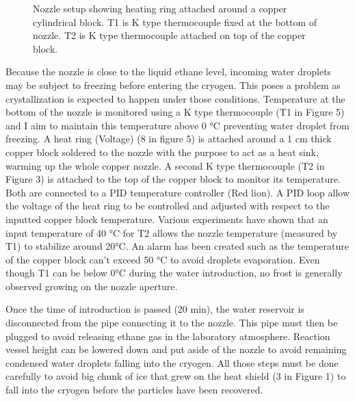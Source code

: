 \documentclass[letterpaper,10pt,english]{jupyterBook}
\begin{document}
\begin{figure}[htbp]
\centering
\capstart

\noindent{}
\caption{Nozzle setup showing heating ring attached around a copper cylindrical block. T1 is K type thermocouple fixed at the bottom of nozzle. T2 is K type thermocouple attached on top of the copper block.}\label{\detokenize{Chapter6/Chapter6:gb-fig4}}\end{figure}

\sphinxAtStartPar
Because the nozzle is close to the liquid ethane level, incoming water droplets may be subject to freezing before entering the cryogen. This poses a problem as crystallization is expected to happen under those conditions. Temperature at the bottom of the nozzle is monitored using a K type thermocouple (T1 in Figure 5) and I aim to maintain this temperature above 0 °C preventing water droplet from freezing.
A heat ring (Voltage) (8 in figure 5) is attached around a 1 cm thick copper block soldered to the nozzle with the purpose to act as a heat sink, warming up the whole copper nozzle. A second K type thermocouple (T2 in Figure 3) is attached to the top of the copper block to monitor its temperature. Both are connected to a PID temperature controller (Red lion). A PID loop allow the voltage of the heat ring to be controlled and adjusted with respect to the inputted copper block temperature. Various experiments have shown that an input temperature of 40 °C for T2 allows the nozzle temperature (measured by T1) to stabilize around 20°C.  An alarm has been created such as the temperature of the copper block can’t exceed 50 °C to avoid droplets evaporation. Even though T1 can be below 0°C during the water introduction, no frost is generally observed growing on the nozzle aperture.

\sphinxAtStartPar
Once the time of introduction is passed (20 min), the water reservoir is disconnected from the pipe connecting it to the nozzle. This pipe must then be plugged to avoid releasing ethane gas in the laboratory atmosphere. Reaction vessel height can be lowered down and put aside of the nozzle to avoid remaining condensed water droplets falling into the cryogen. All those steps must be done carefully to avoid big chunk of ice that grew on the heat shield (3 in Figure 1) to fall into the cryogen before the particles have been recovered.
\end{document}
